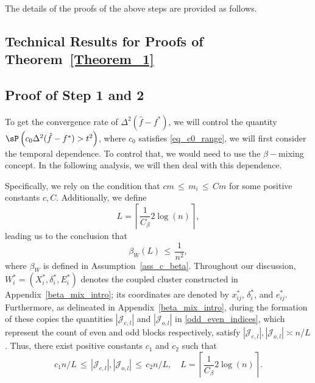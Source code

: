\documentclass[twoside,11pt]{article}
\newcommand{\rev}[1]{{\color{revisionred}#1}}
\begin{document}
The details of the proofs of the above steps are provided as follows. 

\subsection{Technical Results for Proofs of Theorem~\ref{Theorem_1}}

\subsection{Proof of Step 1 and 2}
To get the convergence rate of $\Delta^2(\hat f - f^*)$, we will control the quantity $\sP\left( c_0\Delta^2(\hat f - f^*) > t^2  \right)$, where $c_0$ satisfies \eqref{eq_c0_range}, we will first consider the temporal dependence. To control 
that, we would need to use the $\beta-$mixing concept. In the following analysis, we will then deal with this dependence.  

Specifically, we rely on the condition that \( cm \,\leq\, m_i \,\leq\, Cm \) for some positive constants \( c, C \). Additionally, we define
\begin{equation}
\label{equation}
L = \left\lceil \frac{1}{C_{\beta}} 2\log(n) \right\rceil,
\end{equation}
leading us to the conclusion that
\begin{equation}
\label{beta_decay_rate}
\beta_W(L) \,\leq\, \frac{1}{n^{2}},
\end{equation} where $\beta_W$ is defined in Assumption~\ref{ass_c_beta}.
\rev{Throughout our discussion, $W_i^*=(X_i^*,\delta_i^*,E_i^*)$ denotes the coupled cluster constructed in Appendix~\ref{beta_mix_intro}; its coordinates are denoted by $x_{ij}^*$, $\delta_i^*$, and $e_{ij}^*$.} Furthermore, as delineated in Appendix~\ref{beta_mix_intro}, during the formation of these copies the quantities \( |\mathcal{J}_{e,l}| \) and \( |\mathcal{J}_{o,l}| \) in \eqref{odd_even_indices}, which represent the count of even and odd blocks respectively, satisfy \( |\mathcal{J}_{e,l}|, |\mathcal{J}_{o,l}| \asymp n/L \). Thus, there exist positive constants \( c_1 \) and \( c_2 \) such that
 \begin{equation}
 \label{beta_constants}
c_1 n/L \,\leq\, |\mathcal{J}_{e,l}|, |\mathcal{J}_{o,l}| \,\leq\, c_2 n/L, 
\quad L = \left\lceil \frac{1}{C_{\beta}} 2\log(n) \right\rceil.
\end{equation}
\end{document}
